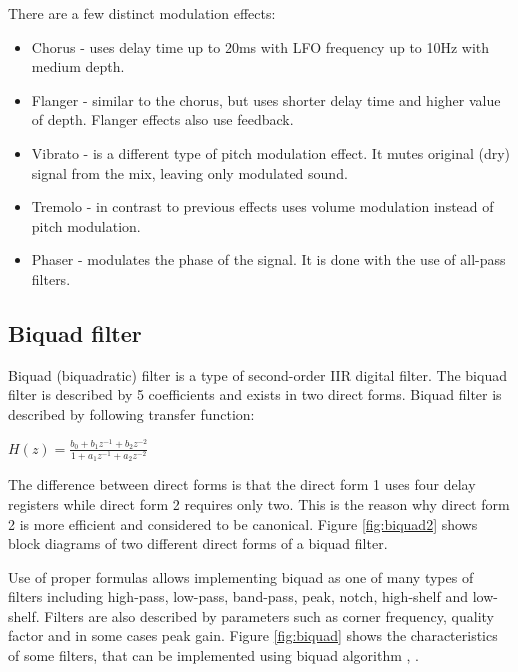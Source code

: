 \documentclass[a4paper,twoside,12pt]{book}
\begin{document}
There are a few distinct modulation effects:
\begin{itemize}
    \item Chorus - uses delay time up to 20ms with LFO frequency up to 10Hz with medium depth.
    \item Flanger - similar to the chorus, but uses shorter delay time and higher value of depth.
        Flanger effects also use feedback.
    \item Vibrato - is a different type of pitch modulation effect. It mutes original (dry) signal
        from the mix, leaving only modulated sound.
    \item Tremolo - in contrast to previous effects uses volume modulation instead of pitch modulation.
    \item Phaser - modulates the phase of the signal. It is done with the use of all-pass filters.
\end{itemize}

\subsection{Biquad filter}
Biquad (biquadratic) filter is a type of second-order IIR digital filter.
The biquad filter is described by 5 coefficients and exists in two direct forms.
Biquad filter is described by following transfer function:

\(H(z) = \frac{b_0 + b_1z^{-1} + b_2z^{-2}}{1 + a_1z^{-1} + a_2z^{-2}}\)

The difference between direct forms is that the direct form 1 uses four delay registers
while direct form 2 requires only two.
This is the reason why direct form 2 is more efficient and considered to be canonical.
Figure \ref{fig:biquad2} shows block diagrams of two different
direct forms of a biquad filter.

Use of proper formulas allows implementing biquad as one of many types of filters
including high-pass, low-pass, band-pass, peak, notch, high-shelf and low-shelf.
Filters are also described by parameters such as corner frequency, quality factor
and in some cases peak gain.
Figure \ref{fig:biquad} shows the characteristics of some filters,
that can be implemented using biquad algorithm
\cite{Biquad},
\cite{biquad_web}.
\end{document}

